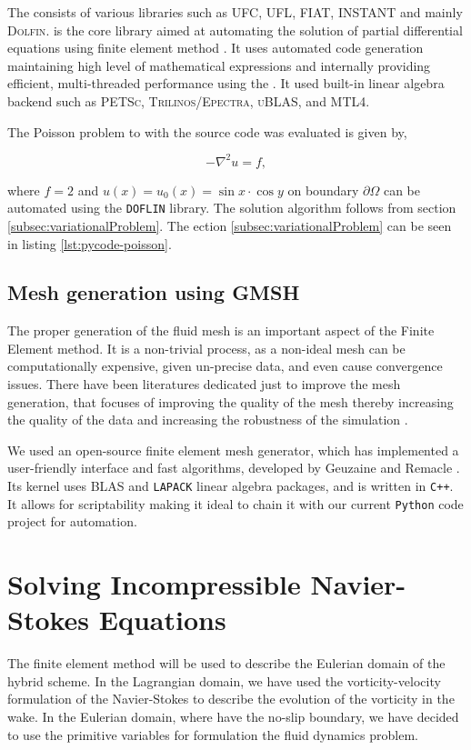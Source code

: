 The consists of various libraries such as \textsc{UFC}, \textsc{UFL}, \textsc{FIAT}, \textsc{INSTANT} and mainly \textsc{Dolfin}. \dolfin is the core library aimed at automating the solution of partial differential equations using finite element method \cite{Logg2011}. It uses automated code generation maintaining high level of mathematical expressions and internally providing efficient, multi-threaded performance using the . It used built-in linear algebra backend such as \textsc{PETSc}, \textsc{Trilinos/Epectra}, \textsc{uBLAS}, and \textsc{MTL4}.

The Poisson problem to with the source code was evaluated is given by,

	\begin{equation}
	-\nabla^2 u = f,
	\end{equation}

where $f=2$ and $u(x) = u_0(x) = \sin x \cdot \cos y$ on boundary $\partial \Omega$ can be automated using the \texttt{DOFLIN} library. The solution algorithm follows from section \ref{subsec:variationalProblem}. The ection \ref{subsec:variationalProblem} can be seen in listing \ref{lst:pycode-poisson}.

\subsection{Mesh generation using GMSH}

The proper generation of the fluid mesh is an important aspect of the Finite Element method. It is a non-trivial process, as a non-ideal mesh can be computationally expensive, given un-precise data, and even cause convergence issues. There have been literatures dedicated just to improve the mesh generation, that focuses of improving the quality of the mesh thereby increasing the quality of the data and increasing the robustness of the simulation \cite{Hansen2005}. 

We used \gmsh an open-source finite element mesh generator, which has implemented a user-friendly interface and fast algorithms, developed by Geuzaine and Remacle \cite{Geuzaine2009a}. Its kernel uses \textsc{BLAS} and \texttt{LAPACK} linear algebra packages, and is written in \texttt{C++}. It allows for scriptability making it ideal to chain it with our current \texttt{Python} code project for automation.

\section{Solving Incompressible Navier-Stokes Equations}
The finite element method will be used to describe the Eulerian domain of the hybrid scheme. In the Lagrangian domain, we have used the vorticity-velocity formulation of the Navier-Stokes to describe the evolution of the vorticity in the wake. In the Eulerian domain, where have the no-slip boundary, we have decided to use the primitive variables for formulation the fluid dynamics problem. 

